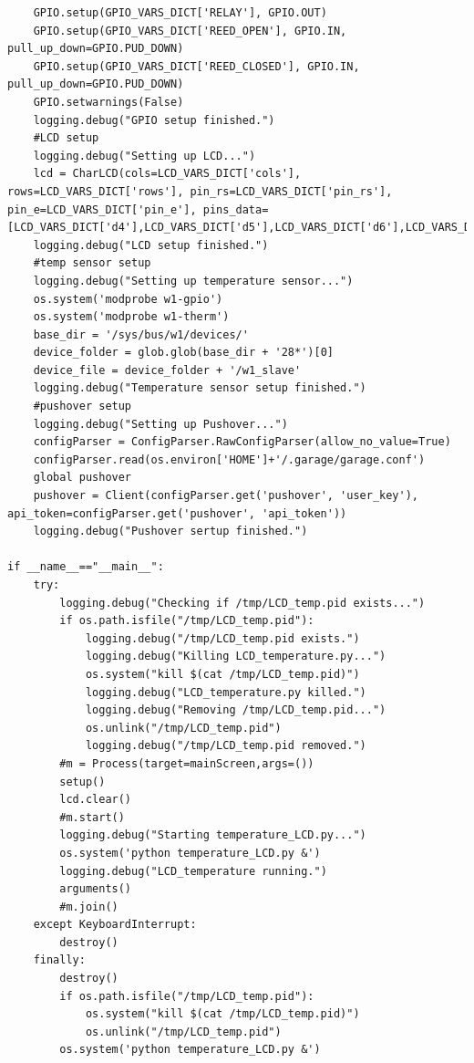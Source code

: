 \documentclass[11pt]{article}
\begin{document}
\begin{verbatim}
    GPIO.setup(GPIO_VARS_DICT['RELAY'], GPIO.OUT)
    GPIO.setup(GPIO_VARS_DICT['REED_OPEN'], GPIO.IN, pull_up_down=GPIO.PUD_DOWN)
    GPIO.setup(GPIO_VARS_DICT['REED_CLOSED'], GPIO.IN, pull_up_down=GPIO.PUD_DOWN)
    GPIO.setwarnings(False)
    logging.debug("GPIO setup finished.")
    #LCD setup
    logging.debug("Setting up LCD...")
    lcd = CharLCD(cols=LCD_VARS_DICT['cols'], rows=LCD_VARS_DICT['rows'], pin_rs=LCD_VARS_DICT['pin_rs'], pin_e=LCD_VARS_DICT['pin_e'], pins_data=[LCD_VARS_DICT['d4'],LCD_VARS_DICT['d5'],LCD_VARS_DICT['d6'],LCD_VARS_DICT['d7']],numbering_mode=GPIO.BCM)
    logging.debug("LCD setup finished.")
    #temp sensor setup
    logging.debug("Setting up temperature sensor...")
    os.system('modprobe w1-gpio')
    os.system('modprobe w1-therm')
    base_dir = '/sys/bus/w1/devices/'
    device_folder = glob.glob(base_dir + '28*')[0]
    device_file = device_folder + '/w1_slave'
    logging.debug("Temperature sensor setup finished.")
    #pushover setup
    logging.debug("Setting up Pushover...")
    configParser = ConfigParser.RawConfigParser(allow_no_value=True)
    configParser.read(os.environ['HOME']+'/.garage/garage.conf')
    global pushover
    pushover = Client(configParser.get('pushover', 'user_key'), api_token=configParser.get('pushover', 'api_token'))
    logging.debug("Pushover sertup finished.")

if __name__=="__main__":
    try:
        logging.debug("Checking if /tmp/LCD_temp.pid exists...")
        if os.path.isfile("/tmp/LCD_temp.pid"):
            logging.debug("/tmp/LCD_temp.pid exists.")
            logging.debug("Killing LCD_temperature.py...")
            os.system("kill $(cat /tmp/LCD_temp.pid)")
            logging.debug("LCD_temperature.py killed.")
            logging.debug("Removing /tmp/LCD_temp.pid...")
            os.unlink("/tmp/LCD_temp.pid")
            logging.debug("/tmp/LCD_temp.pid removed.")
        #m = Process(target=mainScreen,args=())
        setup()
        lcd.clear()
        #m.start()
        logging.debug("Starting temperature_LCD.py...")
        os.system('python temperature_LCD.py &')
        logging.debug("LCD_temperature running.")
        arguments()
        #m.join()
    except KeyboardInterrupt:
        destroy()
    finally:
        destroy()
        if os.path.isfile("/tmp/LCD_temp.pid"):
            os.system("kill $(cat /tmp/LCD_temp.pid)")
            os.unlink("/tmp/LCD_temp.pid")
        os.system('python temperature_LCD.py &')
\end{verbatim}
\newpage
\end{document}
